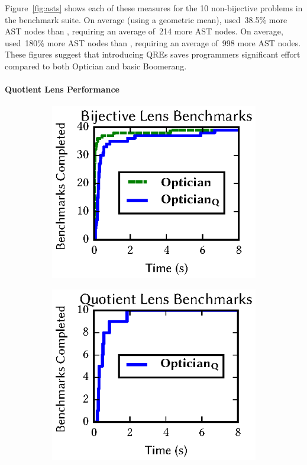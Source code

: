 \documentclass[12pt]{article}
\begin{document}
{Figure~\ref{fig:asts} shows each of these measures for the 10
non-bijective problems in the benchmark suite.  On
average (using a geometric mean), \canonizeAndSpecSize{} used~38.5\% more AST nodes
than \QRESize{}, requiring an average of~214 more AST nodes. On 
average, \LensAndSpecSize{} used~180\% more AST nodes than \QRESize{}, requiring an
average of~998 more AST nodes. These figures suggest that introducing QREs saves
programmers significant effort compared to both Optician and basic
Boomerang.

\paragraph*{Quotient Lens Performance}

\begin{figure}[t]
\centering
\begin{subfigure}[b]{.49\textwidth}
\centering
\includegraphics{qfigs/times_opt}
\caption{}
\label{subfig:lenssize}
\end{subfigure}
\begin{subfigure}[b]{.49\textwidth}
\includegraphics{qfigs/times_new.eps}

\end{subfigure}
\end{figure}}
\end{document}
